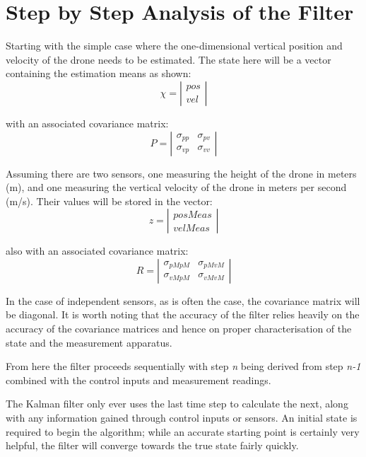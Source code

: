 \section{Step by Step Analysis of the Filter}
Starting with the simple case where the one-dimensional vertical position and velocity of the drone needs to be estimated. The state here will be a vector containing the estimation means as shown:
\[\chi 
=
\left |  \begin{array}{c}
pos \\
vel
\end{array}  \right |\]

with an associated covariance matrix:
\[ P 
= 
\left |  \begin{array}{cc}
\sigma_{pp} & \sigma_{pv} \\
\sigma_{vp} & \sigma_{vv}
\end{array}  \right |\]


Assuming there are two sensors, one measuring the height of the drone in meters (m), and one measuring the vertical velocity of the drone in meters per second (m/s). Their values will be stored in the vector:
\[z 
=
\left |  \begin{array}{c}
posMeas \\
velMeas
\end{array}  \right |\]

also with an associated covariance matrix:
\[R 
= 
\left |  \begin{array}{cc}
\sigma_{pMpM} & \sigma_{pMvM} \\
\sigma_{vMpM} & \sigma_{vMvM}
\end{array}  \right |\]

In the case of independent sensors, as is often the case, the covariance matrix will be diagonal.
It is worth noting that the accuracy of the filter relies heavily on the accuracy of the covariance matrices and hence on proper characterisation of the state and the measurement apparatus.\par
From here the filter proceeds sequentially with step \textit{n} being derived from step \textit{n-1} combined with the control inputs and measurement readings.

The Kalman filter only ever uses the last time step to calculate the next, along with any information gained through control inputs or sensors. An initial state is required to begin the algorithm; while an accurate starting point is certainly very helpful, the filter will converge towards the true state fairly quickly.

